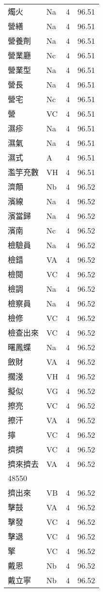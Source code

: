 \documentclass[twocolumn]{book}
\begin{document}
\begin{supertabular}{llrr}
燭火 & Na & 4 &  96.51\\
營繕 & Na & 4 &  96.51\\
營養劑 & Na & 4 &  96.51\\
營業廳 & Nc & 4 &  96.51\\
營業型 & Na & 4 &  96.51\\
營長 & Na & 4 &  96.51\\
營宅 & Nc & 4 &  96.51\\
營 & VC & 4 &  96.51\\
濕疹 & Na & 4 &  96.51\\
濕氣 & Na & 4 &  96.51\\
濕式 & A & 4 &  96.51\\
濫竽充數 & VH & 4 &  96.51\\
濟顛 & Nb & 4 &  96.52\\
濱線 & Na & 4 &  96.52\\
濱當歸 & Na & 4 &  96.52\\
濱南 & Nc & 4 &  96.52\\
檢驗員 & Na & 4 &  96.52\\
檢錯 & VA & 4 &  96.52\\
檢閱 & VC & 4 &  96.52\\
檢調 & Na & 4 &  96.52\\
檢察員 & Na & 4 &  96.52\\
檢修 & VC & 4 &  96.52\\
檢查出來 & VC & 4 &  96.52\\
曙鳳蝶 & Na & 4 &  96.52\\
斂財 & VA & 4 &  96.52\\
擱淺 & VH & 4 &  96.52\\
擬似 & VG & 4 &  96.52\\
擦亮 & VC & 4 &  96.52\\
擦汗 & VA & 4 &  96.52\\
擰 & VC & 4 &  96.52\\
擠擠 & VC & 4 &  96.52\\
擠來擠去 & VA & 4 &  96.52\\
48550\\
擠出來 & VB & 4 &  96.52\\
擊鼓 & VA & 4 &  96.52\\
擊發 & VC & 4 &  96.52\\
擊退 & VC & 4 &  96.52\\
擎 & VC & 4 &  96.52\\
戴恩 & Nb & 4 &  96.52\\
戴立寧 & Nb & 4 &  96.52\\

\end{supertabular}
\end{document}
